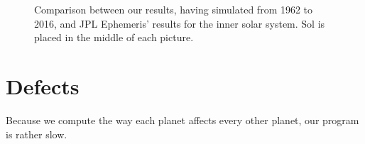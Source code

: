 \documentclass[a4paper]{article}
\begin{document}
\begin{figure}[!ht]
\caption{Comparison between our results, having simulated from 1962 to 2016, and JPL Ephemeris' results for the inner solar system. Sol is placed in the middle of each picture.}
\label{comparison}
\end{figure}

\section{Defects}

Because we compute the way each planet affects every other planet, our program is rather slow.
\end{document}
